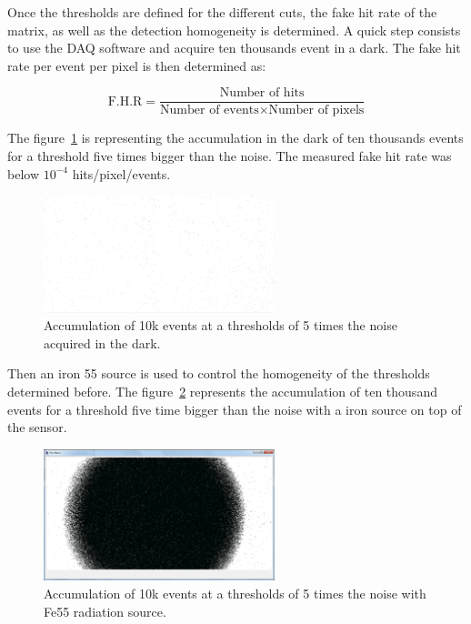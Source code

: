   Once the thresholds are defined for the different cuts, the fake hit rate of the matrix, as well as the detection homogeneity is determined.
  A quick step consists to use the DAQ software and acquire ten thousands event in a dark. 
  The fake hit rate per event per pixel is then determined as:

  \begin{equation}
    \text{F.H.R} = \frac{\text{Number of hits}}{\text{Number of events} \times \text{Number of pixels}} 
  \end{equation}
  
  The figure~\ref{fig:darkEvents} is representing the accumulation in the dark of ten thousands events for a threshold five times bigger than the noise.
  The measured fake hit rate was below $10^{-4}$ hits/pixel/events.

   \begin{figure}[!h]
    \centering
    \includegraphics[width=0.6\textwidth]{Pictures/labTests/8sigma_10kEvents_noSource}
    \caption{Accumulation of 10k events at a thresholds of 5 times the noise acquired in the dark.}
    \label{fig:darkEvents}
  \end{figure}

  Then an iron 55 source is used to control the homogeneity of the thresholds determined before.
  The figure~\ref{fig:fe55} represents the accumulation of ten thousand events for a threshold five time bigger than the noise with a iron source on top of the sensor.
  
  \begin{figure}[!h]
    \centering
    \includegraphics[width=0.6\textwidth]{Pictures/labTests/10kEvents_Fe55_cut5sigma.png}
    \caption{Accumulation of 10k events at a thresholds of 5 times the noise with Fe55 radiation source.}
    \label{fig:fe55}
  \end{figure}

